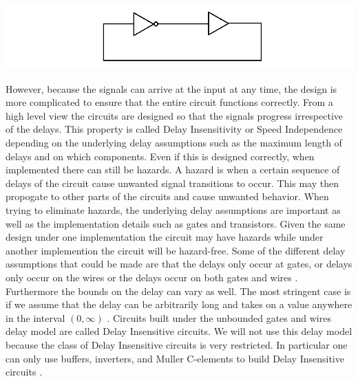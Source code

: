 \documentclass[12pt]{report}
\begin{document}
\includegraphics[width=\textwidth]{asyncex}

However, because the signals can arrive at the input at any time, the design is more complicated to ensure that the entire circuit functions correctly.  From a high level view the circuits are designed so that the signals progress irrespective of the delays.  This property is called Delay Insensitivity or Speed Independence depending on the underlying delay assumptions such as the maximum length of delays and on which components.  Even if this is designed correctly, when implemented there can still be hazards.  A hazard is when a certain sequence of delays of the circuit cause unwanted signal transitions to occur.  This may then propogate to other parts of the circuits and cause unwanted behavior.  When trying to eliminate hazards, the underlying delay assumptions are important as well as the implementation details such as gates and transistors. Given the same design under one implementation the circuit may have hazards while under another implemention the circuit will be hazard-free.  Some of the different delay assumptions that could be made are that the delays only occur at gates, or delays only occur on the wires or the delays occur on both gates and wires \cite{myers_book_2004}. Furthermore the bounds on the delay can vary as well. The most stringent case is if we assume that the delay can be arbitrarily long and takes on a value anywhere in the interval $(0,\infty)$ \cite{myers_book_2004}.  Circuits built under the unbounded gates and wires delay model are called Delay Insensitive circuits.  We will not use this delay model because the class of Delay Insensitive circuits is very restricted.  In particular one can only use buffers, inverters, and Muller C-elements to build Delay Insensitive circuits \cite{Martin_1990_DI} \cite{Martin1986_DI}.\\ %
\end{document}
